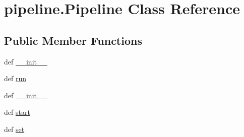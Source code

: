 \hypertarget{classpipeline_1_1_pipeline}{\section{pipeline.\-Pipeline \-Class \-Reference}
\label{classpipeline_1_1_pipeline}
}
\subsection*{\-Public \-Member \-Functions}
\begin{DoxyCompactItemize}
\item 
def \hyperlink{classpipeline_1_1_pipeline_a587fd29c3e21a1c64a72274a41f917c7}{\-\_\-\-\_\-init\-\_\-\-\_\-}
\item 
def \hyperlink{classpipeline_1_1_pipeline_ae2927e6fbb228221193d325ea157373e}{run}
\item 
def \hyperlink{classpipeline_1_1_pipeline_a587fd29c3e21a1c64a72274a41f917c7}{\-\_\-\-\_\-init\-\_\-\-\_\-}
\item 
def \hyperlink{classpipeline_1_1_pipeline_a9cc2f72d2d10a06d711c2c23cdff4b30}{start}
\item 
def \hyperlink{classpipeline_1_1_pipeline_a46e0d920ba60c9edffec65d7d4ae0b81}{set}
\end{DoxyCompactItemize}

